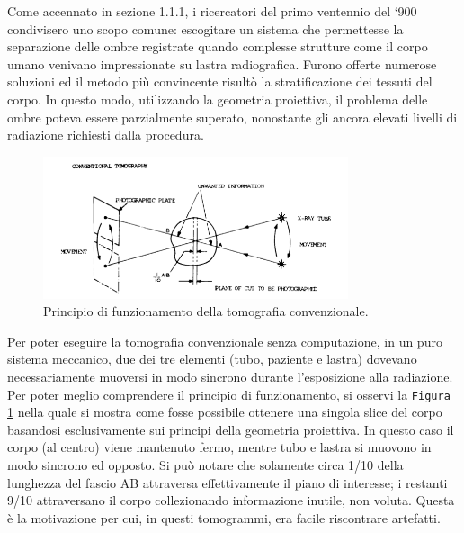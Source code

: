 \documentclass[a4paper,11pt, oneside]{article}
\begin{document}
                \par
                    Come accennato in sezione 1.1.1, i ricercatori del primo ventennio del ‘900 condivisero uno scopo comune: escogitare un sistema che permettesse la separazione delle ombre registrate quando complesse strutture come il corpo umano venivano impressionate su lastra radiografica. Furono offerte numerose soluzioni ed il metodo più convincente risultò la stratificazione dei tessuti del corpo. In questo modo, utilizzando la geometria proiettiva, il problema delle ombre poteva essere parzialmente superato, nonostante gli ancora elevati livelli di radiazione richiesti dalla procedura.
                            
                    \begin{figure}[h]
                        \centering
                        \includegraphics[width=0.8\textwidth]{conventional}
                        \caption{Principio di funzionamento della tomografia convenzionale.}
                        \label{fig:conventional}
                    \end{figure}
                            
                    Per poter eseguire la tomografia convenzionale senza computazione, in un puro sistema meccanico, due dei tre elementi (tubo, paziente e lastra) dovevano necessariamente muoversi in modo sincrono durante l’esposizione alla radiazione.
                    Per poter meglio comprendere il principio di funzionamento, si osservi la \texttt{Figura \ref{fig:conventional}} nella quale si mostra come fosse possibile ottenere una singola slice del corpo basandosi esclusivamente sui principi della geometria proiettiva. In questo caso il corpo (al centro) viene mantenuto fermo, mentre tubo e lastra si muovono in modo sincrono ed opposto. Si può notare che solamente circa 1/10 della lunghezza del fascio AB attraversa effettivamente il piano di interesse; i restanti 9/10 attraversano il corpo collezionando informazione inutile, non voluta. Questa è la motivazione per cui, in questi tomogrammi, era facile riscontrare artefatti\cite{hounsfield-nobel-lecture}.
    
\end{document}
